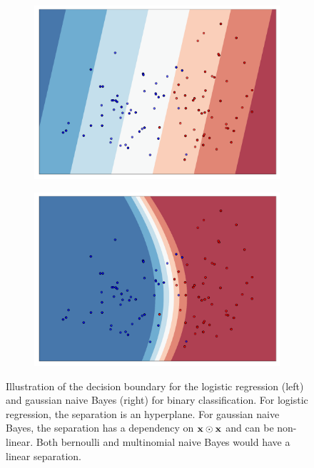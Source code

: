 \begin{figure}
    \centering
    \begin{subfigure}{.5\textwidth}
        \centering
        \includegraphics[width=0.9\linewidth]{figures/log_reg_classification.pdf}
        \label{fig:log_reg_classification}
    \end{subfigure}%
    \begin{subfigure}{.5\textwidth}
        \centering
        \includegraphics[width=0.9\linewidth]{figures/nb_classification.pdf}
        \label{fig:nb_classification}
    \end{subfigure}
    \caption{
        Illustration of the decision boundary for the logistic regression (left)
        and gaussian naive Bayes (right) for binary classification.
        For logistic regression, the separation is an hyperplane.
        For gaussian naive Bayes, the separation has a dependency on $\mathbf{x} \odot \mathbf{x}$ and can be non-linear.
        Both bernoulli and multinomial naive Bayes would have a linear separation.
    }
    \label{fig:log_reg_nb_comparison}
\end{figure}

